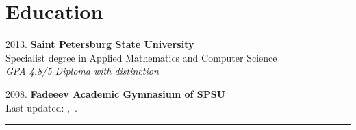 \documentclass[a4paper,10pt]{article}
\begin{document}
\begin{adjustbox}{valign=t}
\begin{minipage}{0.3\textwidth}
\section*{Education}
\raggedright
\textcolor{ColorOne}{2013.}
\textbf{Saint Petersburg State University}\\
Specialist degree in Applied Mathematics and Computer Science\\
\textit{GPA 4.8/5 Diploma with distinction}
\vspace{10 pt}

\textcolor{ColorOne}{2008.}
\textbf{Fadeeev Academic Gymnasium of SPSU}\\

	
\vspace{240 pt}
\centering \small
\textcolor{ColorOne}{Last updated: \monthname,~\the\year.}

\end{minipage}
\end{adjustbox}
%
\hfill
\begin{adjustbox}{valign=t}
\begin{minipage}{0.05\textwidth} %
\textcolor{ColorOne}{\rule{1pt}{\textheight}}
\end{minipage}
\end{adjustbox}
\hfill
%
\end{document}

